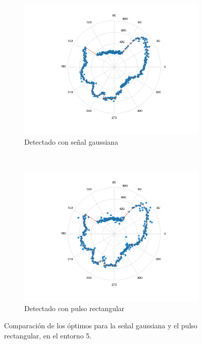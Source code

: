 \documentclass[letterpaper,11pt]{article}
\begin{document}
\begin{figure}[H]
    \centering
    \begin{subfigure}[b]{0.45\textwidth}
        \includegraphics[width=\textwidth]{img/bonus/gaussian_signal.png}
        \caption{Detectado con señal gaussiana}
    \end{subfigure}
    ~ %
    \begin{subfigure}[b]{0.45\textwidth}
        \includegraphics[width=\textwidth]{img/bonus/pulso.png}
        \caption{Detectado con pulso rectangular}
    \end{subfigure}
    \caption{Comparación de los óptimos para la señal gaussiana y el pulso rectangular, en el entorno 5.}
    \label{bonusito}
\end{figure}
\end{document}
